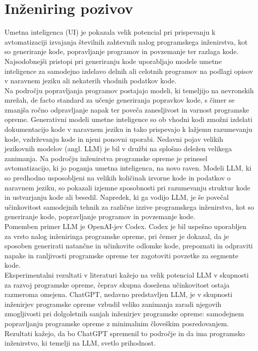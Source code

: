 \documentclass[a4paper,12pt,openright]{book}
\begin{document}
\section{Inženiring pozivov}

Umetna inteligenca (UI) je pokazala velik potencial pri prispevanju k avtomatizaciji izvajanja številnih zahtevnih nalog programskega inženirstva, kot so generiranje kode, popravljanje programov in povzemanje ter razlaga kode. \cite{bavishi2019autopandas} \\
Najsodobnejši pristopi pri generiranju kode uporabljajo modele umetne inteligence za samodejno izdelavo delnih ali celotnih programov na podlagi opisov v naravnem jeziku ali nekaterih vhodnih podatkov kode. \cite{Chen2021EvaluatingLL}\\
Na področju popravljanja programov postajajo modeli, ki temeljijo na nevronskih mrežah, de facto standard za učenje generiranja popravkov kode, s čimer se zmanjša ročno odpravljanje napak ter poveča zanesljivost in varnost programske opreme. Generativni modeli umetne inteligence so ob vhodni kodi zmožni izdelati dokumentacijo kode v naravnem jeziku in tako prispevajo k lažjemu razumevanju kode, vzdrževanju kode in njeni ponovni uporabi. Nedavni pojav velikih jezikovnih modelov (angl. LLM) je bil v družbi na splošno deležen velikega zanimanja. Na področju inženirstva programske opreme je prinesel avtomatizacijo, ki jo poganja umetna inteligenca, na novo raven. Modeli LLM, ki so predhodno usposobljeni na velikih količinah izvorne kode in podatkov o naravnem jeziku, so pokazali izjemne sposobnosti pri razumevanju struktur kode in ustvarjanju kode ali besedil. Napredek, ki ga vodijo LLM, je še povečal učinkovitost samodejnih tehnik za različne izzive programskega inženirstva, kot so generiranje kode, popravljanje programov in povzemanje kode. \cite{wan2018improving}\\
Pomemben primer LLM je OpenAI-jev Codex. Codex je bil uspešno uporabljen za vrsto nalog inženiringa programske opreme, pri čemer je dokazal, da je sposoben generirati natančne in učinkovite odlomke kode, prepoznati in odpraviti napake in ranljivosti programske opreme ter zagotoviti povzetke za segmente kode. \cite{vaithilingam2022expectation} \\
Eksperimentalni rezultati v literaturi kažejo na velik potencial LLM v skupnosti za razvoj programske opreme, čeprav skupna dosežena učinkovitost ostaja razmeroma omejena. ChatGPT, nedavno predstavljen LLM, je v skupnosti inženirjev programske opreme vzbudil veliko zanimanja zaradi njegovih zmogljivosti pri dolgoletnih sanjah inženirjev programske opreme: samodejnem popravljanju programske opreme z minimalnim človeškim posredovanjem. Rezultati kažejo, da bo ChatGPT spremenil to področje in da ima programsko inženirstvo, ki temelji na LLM, svetlo prihodnost. \cite{tian2023chatgptultimateprogrammingassistant} \\
\end{document}
